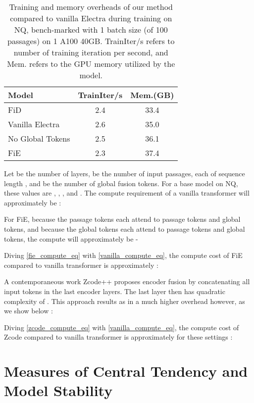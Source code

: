 \documentclass[11pt]{article}
\begin{document}
\begin{table}[h!]
\begin{center}
\begin{tabular}{lcc}
\toprule
\textbf{Model} & \textbf{TrainIter/s}  & \textbf{Mem.(GB)} \\ 
\toprule
FiD & 2.4 & 33.4 \\
Vanilla Electra & 2.6 & 35.0 \\
No Global Tokens & 2.5 & 36.1 \\
FiE & 2.3 & 37.4 \\
\bottomrule
\end{tabular}
\end{center}
\caption{Training and memory overheads of our method compared to vanilla Electra during training on NQ, bench-marked with 1 batch size (of 100 passages) on 1 A100 40GB. TrainIter/s refers to number of training iteration per second, and Mem. refers to the GPU memory utilized by the model.}
\label{tab_mem_comp_emp}
\end{table}

Let  be the number of layers,  be the number of input passages, each of sequence length , and  be the number of global fusion tokens. For a base model on NQ, these values are , , , and . The compute requirement of a vanilla transformer will approximately be :

For FiE, because the  passage tokens each attend to  passage tokens and  global tokens, and because the  global tokens each attend to  passage tokens and  global tokens, the compute will approximately be -


Diving \cref{fie_compute_eq} with \cref{vanilla_compute_eq}, the compute cost of FiE compared to vanilla transformer is approximately  :


A contemporaneous work Zcode++ \cite{zcode_plus_plus} proposes encoder fusion by concatenating all input tokens in the last encoder layers. The last layer then has quadratic complexity of . This approach results as in a much higher overhead however, as we show below : 


Diving \cref{zcode_compute_eq} with \cref{vanilla_compute_eq}, the compute cost of Zcode compared to vanilla transformer is approximately  for these settings :



\section{Measures of Central Tendency and Model Stability}
\end{document}

